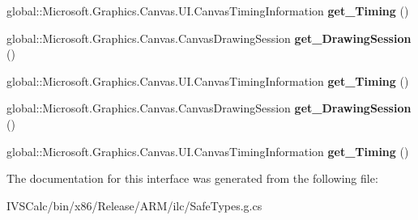 \begin{DoxyCompactItemize}
global\+::\+Microsoft.\+Graphics.\+Canvas.\+U\+I.\+Canvas\+Timing\+Information {\bfseries get\+\_\+\+Timing} ()
\item 
\mbox{\label{interface_microsoft_1_1_graphics_1_1_canvas_1_1_u_i_1_1_xaml_1_1_i_canvas_animated_draw_event_args_a66edca0e36c38097c28d7659a49b65a1}} 
global\+::\+Microsoft.\+Graphics.\+Canvas.\+Canvas\+Drawing\+Session {\bfseries get\+\_\+\+Drawing\+Session} ()
\item 
\mbox{\label{interface_microsoft_1_1_graphics_1_1_canvas_1_1_u_i_1_1_xaml_1_1_i_canvas_animated_draw_event_args_af74d50664a8a3c02268c934bdbe7bb5c}} 
global\+::\+Microsoft.\+Graphics.\+Canvas.\+U\+I.\+Canvas\+Timing\+Information {\bfseries get\+\_\+\+Timing} ()
\item 
\mbox{\label{interface_microsoft_1_1_graphics_1_1_canvas_1_1_u_i_1_1_xaml_1_1_i_canvas_animated_draw_event_args_a66edca0e36c38097c28d7659a49b65a1}} 
global\+::\+Microsoft.\+Graphics.\+Canvas.\+Canvas\+Drawing\+Session {\bfseries get\+\_\+\+Drawing\+Session} ()
\item 
\mbox{\label{interface_microsoft_1_1_graphics_1_1_canvas_1_1_u_i_1_1_xaml_1_1_i_canvas_animated_draw_event_args_af74d50664a8a3c02268c934bdbe7bb5c}} 
global\+::\+Microsoft.\+Graphics.\+Canvas.\+U\+I.\+Canvas\+Timing\+Information {\bfseries get\+\_\+\+Timing} ()
\end{DoxyCompactItemize}


The documentation for this interface was generated from the following file\+:\begin{DoxyCompactItemize}
\item 
I\+V\+S\+Calc/bin/x86/\+Release/\+A\+R\+M/ilc/Safe\+Types.\+g.\+cs\end{DoxyCompactItemize}
